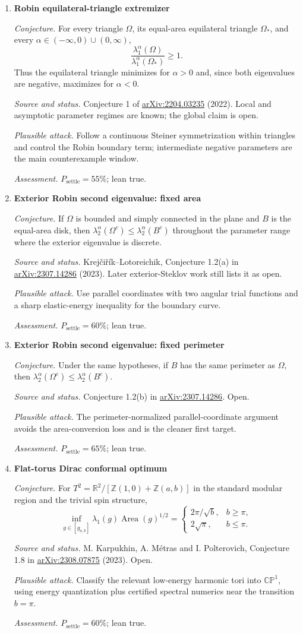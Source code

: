 \documentclass[11pt]{article}
\newcommand{\cand}[5]{%
  \item \textbf{#1}\par
  \emph{Conjecture.} #2\par
  \emph{Source and status.} #3\par
  \emph{Plausible attack.} #4\par
  \emph{Assessment.} #5
}
\newcommand{\psettle}{P_{\mathrm{settle}}}
\begin{document}
\begin{enumerate}[label=\textbf{M\arabic*.}]
\cand{Robin equilateral-triangle extremizer}
{For every triangle $\Omega$, its equal-area equilateral triangle $\Omega_*$, and every $\alpha\in(-\infty,0)\cup(0,\infty)$,
\[\frac{\lambda_1^\alpha(\Omega)}{\lambda_1^\alpha(\Omega_*)}\ge1.\]
Thus the equilateral triangle minimizes for $\alpha>0$ and, since both eigenvalues are negative, maximizes for $\alpha<0$.}
{Conjecture 1 of \href{https://arxiv.org/abs/2204.03235}{arXiv:2204.03235} (2022).  Local and asymptotic parameter regimes are known; the global claim is open.}
{Follow a continuous Steiner symmetrization within triangles and control the Robin boundary term; intermediate negative parameters are the main counterexample window.}
{$\psettle=55\%$; lean true.}

\cand{Exterior Robin second eigenvalue: fixed area}
{If $\Omega$ is bounded and simply connected in the plane and $B$ is the equal-area disk, then $\lambda_2^\alpha(\Omega^c)\le\lambda_2^\alpha(B^c)$ throughout the parameter range where the exterior eigenvalue is discrete.}
{Krej\v{c}i\v{r}\'ik--Lotoreichik, Conjecture 1.2(a) in \href{https://arxiv.org/abs/2307.14286}{arXiv:2307.14286} (2023).  Later exterior-Steklov work still lists it as open.}
{Use parallel coordinates with two angular trial functions and a sharp elastic-energy inequality for the boundary curve.}
{$\psettle=60\%$; lean true.}

\cand{Exterior Robin second eigenvalue: fixed perimeter}
{Under the same hypotheses, if $B$ has the same perimeter as $\Omega$, then $\lambda_2^\alpha(\Omega^c)\le\lambda_2^\alpha(B^c)$.}
{Conjecture 1.2(b) in \href{https://arxiv.org/abs/2307.14286}{arXiv:2307.14286}.  Open.}
{The perimeter-normalized parallel-coordinate argument avoids the area-conversion loss and is the cleaner first target.}
{$\psettle=65\%$; lean true.}

\cand{Flat-torus Dirac conformal optimum}
{For $T^2=\mathbb R^2/[\mathbb Z(1,0)+\mathbb Z(a,b)]$ in the standard modular region and the trivial spin structure,
\[\inf_{g\in[g_{a,b}]}\lambda_1(g)\operatorname{Area}(g)^{1/2}=
\begin{cases}2\pi/\sqrt b,&b\ge\pi,\\2\sqrt\pi,&b\le\pi.\end{cases}\]}
{M. Karpukhin, A. M\'etras and I. Polterovich, Conjecture 1.8 in \href{https://arxiv.org/abs/2308.07875}{arXiv:2308.07875} (2023).  Open.}
{Classify the relevant low-energy harmonic tori into $\mathbb{CP}^1$, using energy quantization plus certified spectral numerics near the transition $b=\pi$.}
{$\psettle=60\%$; lean true.}


\end{enumerate}
\end{document}
